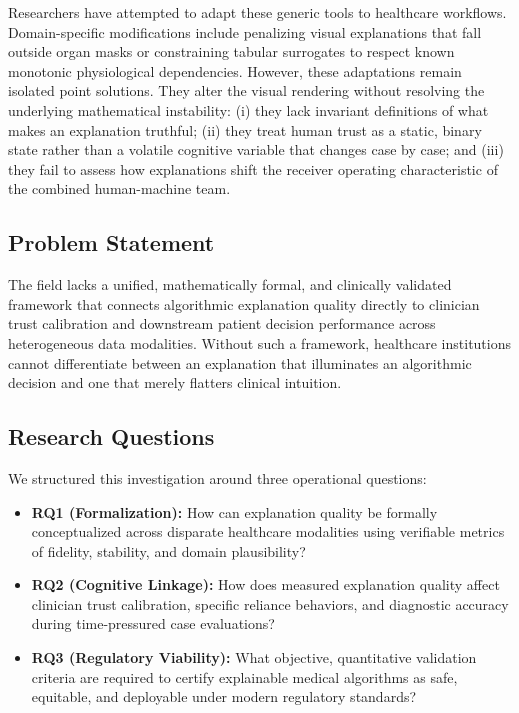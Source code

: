 \documentclass[10pt,journal,compsoc]{IEEEtran}
\begin{document}
Researchers have attempted to adapt these generic tools to healthcare workflows. Domain-specific modifications include penalizing visual explanations that fall outside organ masks or constraining tabular surrogates to respect known monotonic physiological dependencies. However, these adaptations remain isolated point solutions. They alter the visual rendering without resolving the underlying mathematical instability: (i) they lack invariant definitions of what makes an explanation truthful; (ii) they treat human trust as a static, binary state rather than a volatile cognitive variable that changes case by case; and (iii) they fail to assess how explanations shift the receiver operating characteristic of the combined human-machine team.

\subsection{Problem Statement}
The field lacks a unified, mathematically formal, and clinically validated framework that connects algorithmic explanation quality directly to clinician trust calibration and downstream patient decision performance across heterogeneous data modalities. Without such a framework, healthcare institutions cannot differentiate between an explanation that illuminates an algorithmic decision and one that merely flatters clinical intuition.

\subsection{Research Questions}
We structured this investigation around three operational questions:
\begin{itemize}
    \item \textbf{RQ1 (Formalization):} How can explanation quality be formally conceptualized across disparate healthcare modalities using verifiable metrics of fidelity, stability, and domain plausibility?
    \item \textbf{RQ2 (Cognitive Linkage):} How does measured explanation quality affect clinician trust calibration, specific reliance behaviors, and diagnostic accuracy during time-pressured case evaluations?
    \item \textbf{RQ3 (Regulatory Viability):} What objective, quantitative validation criteria are required to certify explainable medical algorithms as safe, equitable, and deployable under modern regulatory standards?
\end{itemize}
\end{document}
